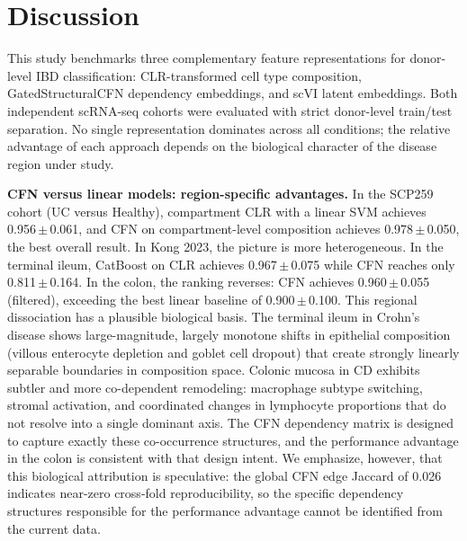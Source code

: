 \documentclass[11pt,letterpaper]{article}
\begin{document}
\section{Discussion}

This study benchmarks three complementary feature representations for
donor-level IBD classification: CLR-transformed cell type composition,
GatedStructuralCFN dependency embeddings, and scVI latent embeddings. Both
independent scRNA-seq cohorts were evaluated with strict donor-level train/test
separation. No single representation dominates across all conditions; the
relative advantage of each approach depends on the biological character of the
disease region under study.

\textbf{CFN versus linear models: region-specific advantages.}
In the SCP259 cohort (UC versus Healthy), compartment CLR with a linear SVM
achieves 0.956\,$\pm$\,0.061, and CFN on compartment-level composition achieves
0.978\,$\pm$\,0.050, the best overall result. In Kong 2023, the picture is more
heterogeneous. In the terminal ileum, CatBoost on CLR achieves
0.967\,$\pm$\,0.075 while CFN reaches only 0.811\,$\pm$\,0.164. In the colon,
the ranking reverses: CFN achieves 0.960\,$\pm$\,0.055 (filtered), exceeding the best
linear baseline of 0.900\,$\pm$\,0.100. This regional dissociation has a
plausible biological basis. The terminal ileum in Crohn's disease shows
large-magnitude, largely monotone shifts in epithelial composition (villous
enterocyte depletion and goblet cell dropout) that create strongly linearly
separable boundaries in composition space. Colonic mucosa in CD exhibits
subtler and more co-dependent remodeling: macrophage subtype switching,
stromal activation, and coordinated changes in lymphocyte proportions that do
not resolve into a single dominant axis. The CFN dependency matrix is designed
to capture exactly these co-occurrence structures, and the performance advantage
in the colon is consistent with that design intent. We emphasize, however, that
this biological attribution is speculative: the global CFN edge Jaccard of 0.026
indicates near-zero cross-fold reproducibility, so the specific dependency
structures responsible for the performance advantage cannot be identified from
the current data.
\end{document}
